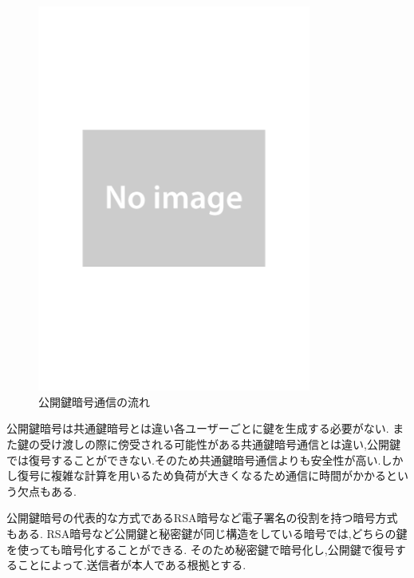 \documentclass[a4j,12pt]{jsarticle}
\begin{document}
\begin{figure}[H]
\centering
\includegraphics[width=9cm]{noimage.pdf}
\caption{公開鍵暗号通信の流れ}
\label{fig:no}
\end{figure} 

公開鍵暗号は共通鍵暗号とは違い各ユーザーごとに鍵を生成する必要がない.
また鍵の受け渡しの際に傍受される可能性がある共通鍵暗号通信とは違い,公開鍵では復号することができない.そのため共通鍵暗号通信よりも安全性が高い.しかし復号に複雑な計算を用いるため負荷が大きくなるため通信に時間がかかるという欠点もある.


公開鍵暗号の代表的な方式であるRSA暗号など電子署名の役割を持つ暗号方式もある.
RSA暗号など公開鍵と秘密鍵が同じ構造をしている暗号では,どちらの鍵を使っても暗号化することができる.
そのため秘密鍵で暗号化し,公開鍵で復号することによって.送信者が本人である根拠とする.
\end{document}
